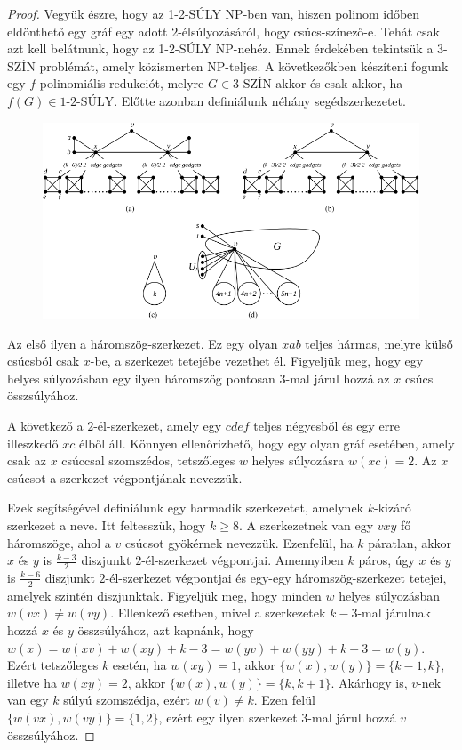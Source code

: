 \documentclass[12pt, a4paper]{report}
\theoremstyle{remark}
\theoremstyle{definition}
\begin{document}
\begin{proof}
Vegyük észre, hogy az 1-2-SÚLY NP-ben van, hiszen polinom időben eldönthető egy gráf egy adott $2$-élsúlyozásáról, hogy csúcs-színező-e. Tehát csak azt kell belátnunk, hogy az 1-2-SÚLY NP-nehéz. Ennek érdekében tekintsük a 3-SZÍN problémát, amely közismerten NP-teljes. A következőkben készíteni fogunk egy $f$ polinomiális redukciót, melyre $G \in \textrm{3-SZÍN}$ akkor és csak akkor, ha $f(G) \in \textrm{1-2-SÚLY}$. Előtte azonban definiálunk néhány segédszerkezetet.
 
\begin{figure}
\centering
\includegraphics[width=\linewidth]{./images/gadgets}
\caption{}
\label{fig:gadgets}
\end{figure}

Az első ilyen a háromszög-szerkezet. Ez egy olyan $xab$ teljes hármas, melyre külső csúcsból csak $x$-be, a szerkezet tetejébe vezethet él. Figyeljük meg, hogy egy helyes súlyozásban egy ilyen háromszög pontosan $3$-mal járul hozzá az $x$ csúcs összsúlyához. 

A következő a $2$-él-szerkezet, amely egy $cdef$ teljes négyesből és egy erre illeszkedő $xc$ élből áll. Könnyen ellenőrizhető, hogy egy olyan gráf esetében, amely csak az $x$ csúccsal szomszédos, tetszőleges $w$ helyes súlyozásra $w(xc) = 2$. Az $x$ csúcsot a szerkezet végpontjának nevezzük.

Ezek segítségével definiálunk egy harmadik szerkezetet, amelynek $k$-kizáró szerkezet a neve. Itt feltesszük, hogy $k \geq 8$. A szerkezetnek van egy $vxy$ fő háromszöge, ahol a $v$ csúcsot gyökérnek nevezzük. Ezenfelül, ha $k$ páratlan, akkor $x$ és $y$ is $\frac{k - 3}{2}$ diszjunkt $2$-él-szerkezet végpontjai. Amennyiben $k$ páros, úgy $x$ és $y$ is $\frac{k - 6}{2}$ diszjunkt $2$-él-szerkezet végpontjai és egy-egy háromszög-szerkezet tetejei, amelyek szintén diszjunktak. Figyeljük meg, hogy minden $w$ helyes súlyozásban $w(vx) \neq w(vy)$. Ellenkező esetben, mivel a szerkezetek $k - 3$-mal járulnak hozzá $x$ és $y$ összsúlyához, azt kapnánk, hogy $w(x) = w(xv) + w(xy) + k - 3 = w(yv) + w(yy) + k - 3 = w(y)$. Ezért tetszőleges $k$ esetén, ha $w(xy) = 1$, akkor $\lbrace w(x), w(y) \rbrace = \lbrace k - 1, k \rbrace$, illetve ha $w(xy) = 2$, akkor $\lbrace w(x), w(y) \rbrace = \lbrace k, k + 1 \rbrace$. Akárhogy is, $v$-nek van egy $k$ súlyú szomszédja, ezért $w(v) \neq k$. Ezen felül $\lbrace w(vx), w(vy) \rbrace = \lbrace 1, 2 \rbrace$, ezért egy ilyen szerkezet $3$-mal járul hozzá $v$ összsúlyához.


\end{proof}
\end{document}
